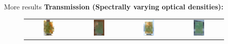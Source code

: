 \documentclass[final]{beamer}
\newlength{\sepwid}
\newlength{\twocolwid}
\begin{document}
\begin{frame}[t]
\begin{columns}[t]
    \begin{column}{\sepwid}\end{column} %
    \begin{column}{\twocolwid} %
        \begin{block}{More results}
            \textbf{Transmission (Spectrally varying optical densities):}
            \vspace{-1cm}
            \begin{figure}
            	\begin{tabular}{cccc}
            		\includegraphics[width=0.24\textwidth]{results/zhaoyun_bg1_1.jpg} &
            		\includegraphics[width=0.24\textwidth]{results/zhaoyun_bg1_2.jpg} &
            		\includegraphics[width=0.24\textwidth]{results/zhaoyun_bg2_1.jpg} &
            		\includegraphics[width=0.24\textwidth]{results/zhaoyun_bg2_2.jpg}

\end{tabular}
\end{figure}
\end{block}
\end{column}
\end{columns}
\end{frame}
\end{document}
